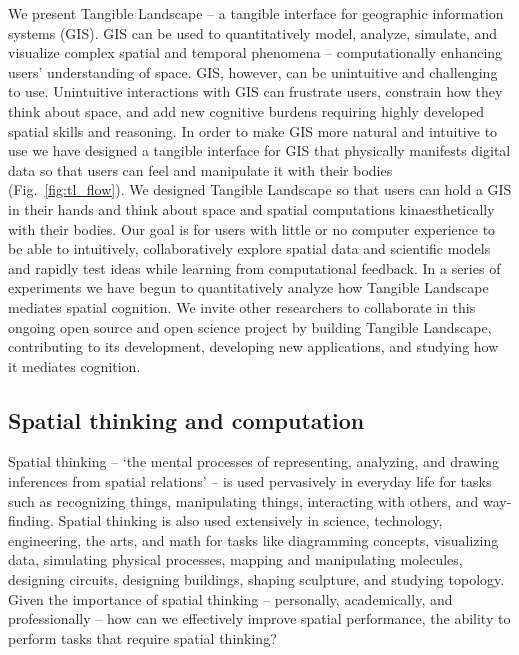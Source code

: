 \documentclass[prodmode,acmtochi]{acmsmall} %
\begin{document}
We present Tangible Landscape -- 
a tangible interface for geographic information systems (GIS). 
%
GIS can be used to quantitatively model, analyze, simulate, and visualize 
complex spatial and temporal phenomena 
-- computationally enhancing users' understanding of space. 
%
GIS, however, can be unintuitive and challenging to use. 
%
Unintuitive interactions with GIS can 
frustrate users,
constrain how they think about space,
and add new cognitive burdens
requiring highly developed spatial skills and reasoning. 
%
In order to make GIS more natural and intuitive to use
we have designed a tangible interface for GIS
that physically manifests digital data 
so that users can feel and manipulate it with their bodies (Fig.~\ref{fig:tl_flow}). 
%
We designed Tangible Landscape
so that users can hold a GIS in their hands
and think about 
space and spatial computations 
kinaesthetically with their bodies.
%
Our goal is for users with little or no computer experience 
to be able to intuitively, collaboratively explore spatial data and scientific models and 
rapidly test ideas while learning from computational feedback. 
%
In a series of experiments we have begun to
quantitatively analyze how 
Tangible Landscape mediates spatial cognition. 
%
We invite other researchers to collaborate 
in this ongoing open source and open science project 
by building Tangible Landscape,
contributing to its development,
developing new applications, 
and studying how it mediates cognition. 

\subsection{Spatial thinking and computation}

Spatial thinking -- `the mental processes of representing, analyzing, and drawing inferences from spatial relations' \cite{Uttal2013} -- is used pervasively in everyday life %
for tasks such as recognizing things, manipulating things, interacting with others, and way-finding. 
%
Spatial thinking is also used extensively in science, technology, engineering, the arts, and math 
for tasks like 
diagramming concepts, 
visualizing data, %
simulating physical processes,
mapping and manipulating molecules,
designing circuits, 
designing buildings, 
shaping sculpture,
and studying topology. 
%
Given the importance of spatial thinking -- personally, academically, and professionally -- 
how can we effectively improve spatial performance, the ability to perform tasks that require spatial thinking? 
\end{document}
